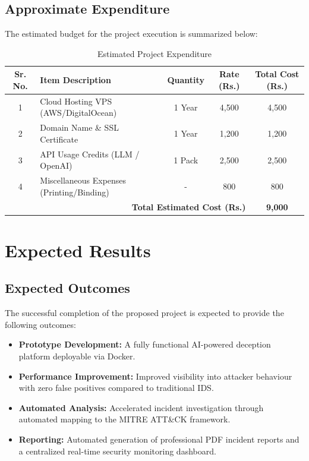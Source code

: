 \documentclass[12pt,a4paper]{report}
\begin{document}
\section{Approximate Expenditure}
The estimated budget for the project execution is summarized below:

\begin{table}[H]
\centering
\caption{Estimated Project Expenditure}
\begin{tabular}{|c|p{6cm}|c|c|c|}
\hline
\textbf{Sr. No.} & \textbf{Item Description} & \textbf{Quantity} & \textbf{Rate (Rs.)} & \textbf{Total Cost (Rs.)} \\
\hline
1 & Cloud Hosting VPS (AWS/DigitalOcean) & 1 Year & 4,500 & 4,500 \\
\hline
2 & Domain Name \& SSL Certificate & 1 Year & 1,200 & 1,200 \\
\hline
3 & API Usage Credits (LLM / OpenAI) & 1 Pack & 2,500 & 2,500 \\
\hline
4 & Miscellaneous Expenses (Printing/Binding) & - & 800 & 800 \\
\hline
\multicolumn{4}{|r|}{\textbf{Total Estimated Cost (Rs.)}} & \textbf{9,000} \\
\hline
\end{tabular}
\end{table}

\clearpage


\chapter{Expected Results}

\section{Expected Outcomes}
The successful completion of the proposed project is expected to provide the following outcomes:
\begin{itemize}
    \item \textbf{Prototype Development:} A fully functional AI-powered deception platform deployable via Docker.
    \item \textbf{Performance Improvement:} Improved visibility into attacker behaviour with zero false positives compared to traditional IDS.
    \item \textbf{Automated Analysis:} Accelerated incident investigation through automated mapping to the MITRE ATT\&CK framework.
    \item \textbf{Reporting:} Automated generation of professional PDF incident reports and a centralized real-time security monitoring dashboard.
\end{itemize}
\end{document}

